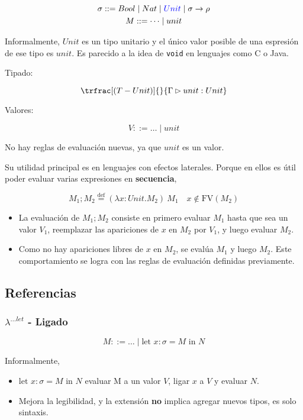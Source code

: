 \documentclass{report}
\theoremstyle{definition} %
\newcommand{\eqdef}{\overset{\text{def}}{=}}
\newcommand{\tfunc}[2]{#1 \to #2}
\newcommand{\abs}[3]{\lambda #1 : #2 . #3}
\newcommand{\app}[2]{#1 \ #2} %
\newcommand{\tipa}[3]{#1 \rhd #2 : #3} %
\newcommand{\Gtipa}[2]{\tipa{\Gamma}{#1}{#2}}
\newcommand{\fv}[1]{\text{FV}(#1)} %
\newcommand{\seq}[2]{#1;#2}
\newcommand{\lambdalet}{\lambda^{\dots let}}
\newcommand{\letin}[4]{\text{let } #1 : #2 = #3 \text{ in } #4}
\newcommand{\deriv}[3]{\trfrac[(#1)]{#2}{#3}}
\begin{document}
\begin{gather*}
    \sigma ::= Bool 
        \mid Nat 
        \mid \textcolor{blue}{Unit} 
        \mid \tfunc{\sigma}{\rho}\\
    M ::= \dots \mid unit
\end{gather*}

Informalmente, $Unit$ es un tipo unitario y el único valor posible de una
espresión de ese tipo es $unit$. Es parecido a la idea de \texttt{void} en
lenguajes como C o Java.

Tipado:

\[
    \deriv{T-Unit}
        {}
        {\Gtipa{unit}{Unit}}
\]

Valores:

\[
    V ::= \dots \mid unit
\]

No hay reglas de evaluación nuevas, ya que $unit$ es un valor.

Su utilidad principal es en lenguajes con efectos laterales. Porque en ellos es
útil poder evaluar varias expresiones en \textbf{secuencia},

\[
    \seq{M_1}{M_2} \eqdef \app{(\abs{x}{Unit}{M_2})}{M_1} \quad x\notin \fv{M_2}
\]

\begin{itemize}
    \item La evaluación de $M_1; M_2$ consiste en primero evaluar $M_1$ hasta
    que sea un valor $V_1$, reemplazar las apariciones de $x$ en $M_2$ por
    $V_1$, y luego evaluar $M_2$.
    \item Como no hay apariciones libres de $x$ en $M_2$, se evalúa $M_1$ y
    luego $M_2$. Este comportamiento se logra con las reglas de evaluación
    definidas previamente.
\end{itemize}

\subsection{Referencias}

\subsubsection{$\lambdalet$ - Ligado}

\[
    M ::= \dots \mid \letin{x}{\sigma}{M}{N}
\]

Informalmente,

\begin{itemize}
    \item $\letin{x}{\sigma}{M}{N}$ evaluar M a un valor $V$, ligar $x$ a $V$ y
    evaluar $N$.
    \item Mejora la legibilidad, y la extensión \textbf{no} implica agregar
    nuevos tipos, es solo sintaxis.
\end{itemize}
\end{document}
